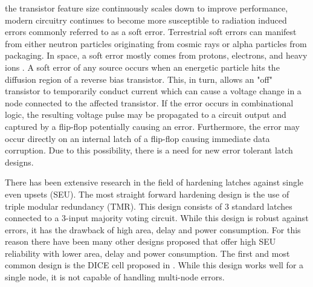 
% 
 the transistor feature size continuously scales down to improve performance, modern circuitry continues to become more susceptible to radiation induced errors commonly referred to as a soft error. Terrestrial soft errors can manifest from either neutron particles originating from cosmic rays or alpha particles from packaging. In space, a soft error mostly comes from protons, electrons, and heavy ions \cite{Zick2008, Schwank2013}. A soft error of any source occurs when an energetic particle hits the diffusion region of a reverse bias transistor. This, in turn, allows an "off" transistor to temporarily conduct current which can cause a voltage change in a node connected to the affected transistor. If the error occurs in combinational logic, the resulting voltage pulse may be propagated to a circuit output and captured by a flip-flop potentially causing an error. Furthermore, the error may occur directly on an internal latch of a flip-flop causing immediate data corruption. Due to this possibility, there is a need for new error tolerant latch designs.

There has been extensive research in the field of hardening latches against single even upsets (SEU). The most straight forward hardening design is the use of triple modular redundancy (TMR). This design consists of 3 standard latches connected to a 3-input majority voting circuit. While this design is robust against errors, it has the drawback of high area, delay and power consumption. For this reason there have been many other designs proposed that offer high SEU reliability with lower area, delay and power consumption. The first and most common design is the DICE cell proposed in \cite{DICE}. While this design works well for a single node, it is not capable of handling multi-node errors. 

